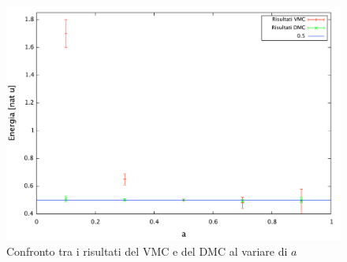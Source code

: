 \documentclass[11pt,a4paper]{article}
\begin{document}
\begin{figure}[!h]
\centering
\includegraphics[scale=0.4]{Img/dmc_var}
\caption{Confronto tra i risultati del VMC e del DMC al variare di $a$}
\end{figure}
\end{document}
